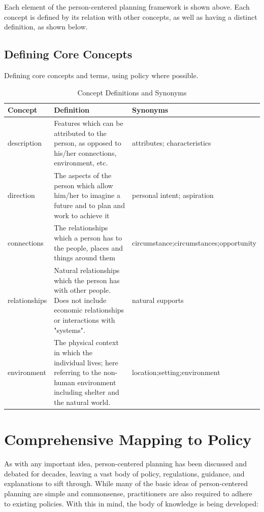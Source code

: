 \documentclass[
]{book}
\begin{document}
Each element of the person-centered planning framework is shown above. Each concept is defined by its relation with other concepts, as well as having a distinct definition, as shown below.

\hypertarget{define}{%
\section{Defining Core Concepts}\label{define}}

Defining core concepts and terms, using policy where possible.

\begin{table}

\caption{\label{tab:unnamed-chunk-9}Concept Definitions and Synonyms}
\centering
\begin{tabular}[t]{l|l|l}
\hline
Concept & Definition & Synonyms\\
\hline
description & Features which can be attributed to the person, as opposed to his/her connections, environment, etc. & attributes; characteristics\\
\hline
direction & The aspects of the person which allow him/her to imagine a future and to plan and work to achieve it & personal intent; aspiration\\
\hline
connections & The relationships which a person has to the people, places and things around them & circumstance;circumstances;opportunity\\
\hline
relationships & Natural relationships which the person has with other people.  Does not include economic relationships or interactions with "systems". & natural supports\\
\hline
environment & The physical context in which the individual lives; here referring to the non-human environment including shelter and the natural world. & location;setting;environment\\
\hline
\end{tabular}
\end{table}

\hypertarget{policy}{%
\chapter{Comprehensive Mapping to Policy}\label{policy}}

As with any important idea, person-centered planning has been discussed and debated for decades, leaving a vast body of policy, regulations, guidance, and explanations to sift through. While many of the basic ideas of person-centered planning are simple and commonsense, practitioners are also required to adhere to existing policies. With this in mind, the body of knowledge is being developed:
\end{document}
